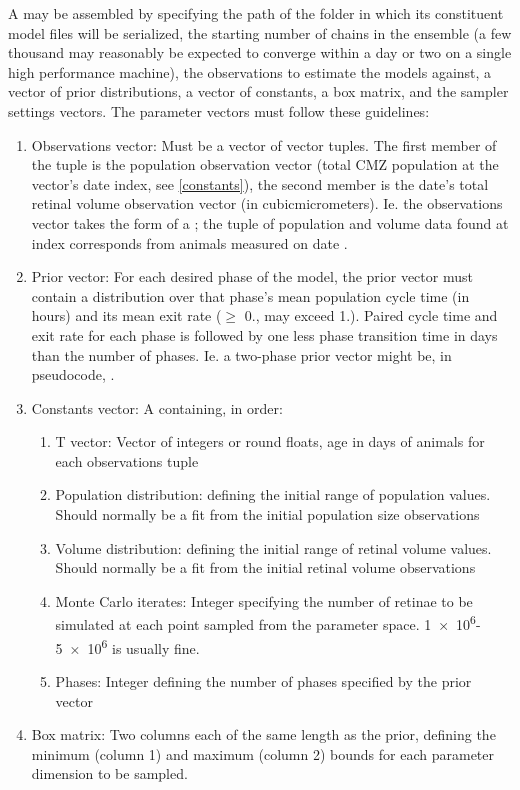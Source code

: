 A  may be assembled by specifying the path of the folder in which its constituent model files will be serialized, the starting number of chains in the ensemble (a few thousand may reasonably be expected to converge within a day or two on a single high performance machine), the observations to estimate the models against, a vector of prior distributions, a vector of constants, a box matrix, and the sampler settings vectors. The parameter vectors must follow these guidelines:

\begin{enumerate}
    \item Observations vector: Must be a vector of vector tuples. The first member of the tuple is the population observation vector (total CMZ population at the vector's date index, see \ref{constants}), the second member is the date's total retinal volume observation vector (in \si{cubic}{micro}{meters}). Ie. the observations vector takes the form of a ; the tuple of population and volume data found at index  corresponds from animals measured on date .
    \item Prior vector: For each desired phase of the model, the prior vector must contain a distribution over that phase's mean population cycle time (in hours) and its mean exit rate ($\geq$ 0., may exceed 1.). Paired cycle time and exit rate for each phase is followed by one less phase transition time in days than the number of phases. Ie. a two-phase prior vector might be, in pseudocode, . 
    \item\label{constants} Constants vector: A  containing, in order:
    \begin{enumerate}
        \item T vector: Vector of integers or round floats, age in days of animals for each observations tuple
        \item Population distribution:  defining the initial range of population values. Should normally be a fit from the initial population size observations
        \item Volume distribution:   defining the initial range of retinal volume values. Should normally be a fit from the initial retinal volume observations
        \item Monte Carlo iterates: Integer specifying the number of retinae to be simulated at each point sampled from the parameter space. \num{1e6}-\num{5e6} is usually fine.
        \item Phases: Integer defining the number of phases specified by the prior vector
    \end{enumerate}
    \item Box matrix: Two columns each of the same length as the prior, defining the minimum (column 1) and maximum (column 2) bounds for each parameter dimension to be sampled.
\end{enumerate}

